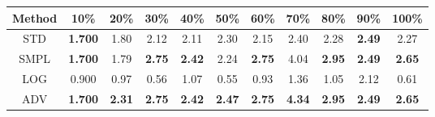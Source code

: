 \documentclass{standalone}
\begin{document}
\begin{tabular}{c|cccccccccc}
      \toprule
      Method & 10\% & 20\% & 30\% & 40\% & 50\% & 60\% & 70\% & 80\% & 90\% & 100\% \\
      \midrule
STD & \textbf{1.700} & 1.80 & 2.12 & 2.11 & 2.30 & 2.15 & 2.40 & 2.28 & \textbf{2.49} & 2.27\\
SMPL & \textbf{1.700} & 1.79 & \textbf{2.75} & \textbf{2.42} & 2.24 & \textbf{2.75} & 4.04 & \textbf{2.95} & \textbf{2.49} & \textbf{2.65}\\
LOG & 0.900 & 0.97 & 0.56 & 1.07 & 0.55 & 0.93 & 1.36 & 1.05 & 2.12 & 0.61\\
ADV & \textbf{1.700} & \textbf{2.31} & \textbf{2.75} & \textbf{2.42} & \textbf{2.47} & \textbf{2.75} & \textbf{4.34} & \textbf{2.95} & \textbf{2.49} & \textbf{2.65}\\
  \bottomrule
\end{tabular}
\end{document}
